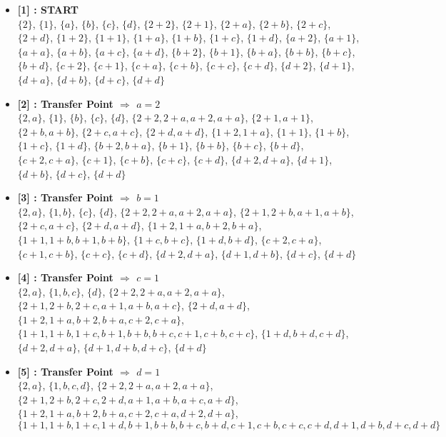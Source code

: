 \begin{itemize}

    \item \textbf{[1] : START}\\
        $\{2\}$, $\{1\}$, $\{a\}$, $\{b\}$, $\{c\}$, $\{d\}$, $\{2 + 2\}$, $\{2 + 1\}$, $\{2 + a\}$, $\{2 + b\}$, $\{2 + c\}$, $\{2 + d\}$, $\{1 + 2\}$, $\{1 + 1\}$, $\{1 + a\}$, $\{1 + b\}$, $\{1 + c\}$, $\{1 + d\}$, $\{a + 2\}$, $\{a + 1\}$, $\{a + a\}$, $\{a + b\}$, $\{a + c\}$, $\{a + d\}$, $\{b + 2\}$, $\{b + 1\}$, $\{b + a\}$, $\{b + b\}$, $\{b + c\}$, $\{b + d\}$, $\{c + 2\}$, $\{c + 1\}$, $\{c + a\}$, $\{c + b\}$, $\{c + c\}$, $\{c + d\}$, $\{d + 2\}$, $\{d + 1\}$, $\{d + a\}$, $\{d + b\}$, $\{d + c\}$, $\{d + d\}$

    \item \textbf{[2] : Transfer Point $\Rightarrow$ $a = 2$}\\
        $\{2, a\}$, $\{1\}$, $\{b\}$, $\{c\}$, $\{d\}$, $\{2 + 2, 2 + a, a + 2, a + a\}$, $\{2 + 1, a + 1\}$, $\{2 + b, a + b\}$, $\{2 + c, a + c\}$, $\{2 + d, a + d\}$, $\{1 + 2, 1 + a\}$, $\{1 + 1\}$, $\{1 + b\}$, $\{1 + c\}$, $\{1 + d\}$, $\{b + 2, b + a\}$, $\{b + 1\}$, $\{b + b\}$, $\{b + c\}$, $\{b + d\}$, $\{c + 2, c + a\}$, $\{c + 1\}$, $\{c + b\}$, $\{c + c\}$, $\{c + d\}$, $\{d + 2, d + a\}$, $\{d + 1\}$, $\{d + b\}$, $\{d + c\}$, $\{d + d\}$

    \item \textbf{[3] : Transfer Point $\Rightarrow$ $b = 1$}\\
        $\{2, a\}$, $\{1, b\}$, $\{c\}$, $\{d\}$, $\{2 + 2, 2 + a, a + 2, a + a\}$, $\{2 + 1, 2 + b, a + 1, a + b\}$, $\{2 + c, a + c\}$, $\{2 + d, a + d\}$, $\{1 + 2, 1 + a, b + 2, b + a\}$, $\{1 + 1, 1 + b, b + 1, b + b\}$, $\{1 + c, b + c\}$, $\{1 + d, b + d\}$, $\{c + 2, c + a\}$, $\{c + 1, c + b\}$, $\{c + c\}$, $\{c + d\}$, $\{d + 2, d + a\}$, $\{d + 1, d + b\}$, $\{d + c\}$, $\{d + d\}$

    \item \textbf{[4] : Transfer Point $\Rightarrow$ $c = 1$}\\
        $\{2, a\}$, $\{1, b, c\}$, $\{d\}$, $\{2 + 2, 2 + a, a + 2, a + a\}$, $\{2 + 1, 2 + b, 2 + c, a + 1, a + b, a + c\}$, $\{2 + d, a + d\}$, $\{1 + 2, 1 + a, b + 2, b + a, c + 2, c + a\}$, $\{1 + 1, 1 + b, 1 + c, b + 1, b + b, b + c, c + 1, c + b, c + c\}$, $\{1 + d, b + d, c + d\}$, $\{d + 2, d + a\}$, $\{d + 1, d + b, d + c\}$, $\{d + d\}$

    \item \textbf{[5] : Transfer Point $\Rightarrow$ $d = 1$}\\
        $\{2, a\}$, $\{1, b, c, d\}$, $\{2 + 2, 2 + a, a + 2, a + a\}$, $\{2 + 1, 2 + b, 2 + c, 2 + d, a + 1, a + b, a + c, a + d\}$, $\{1 + 2, 1 + a, b + 2, b + a, c + 2, c + a, d + 2, d + a\}$, $\{1 + 1, 1 + b, 1 + c, 1 + d, b + 1, b + b, b + c, b + d, c + 1, c + b, c + c, c + d, d + 1, d + b, d + c, d + d\}$


\end{itemize}
